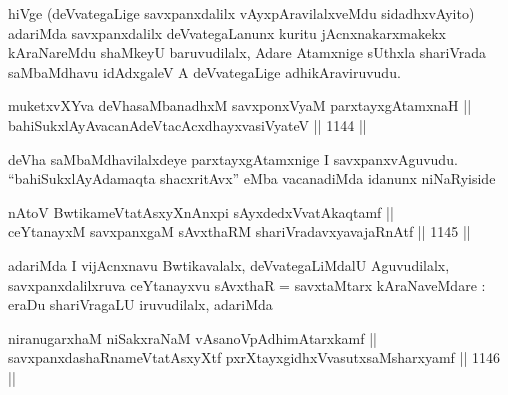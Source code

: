 \begin{artha}
hiVge (deVvategaLige savxpanxdalilx vAyxpAravilalxveMdu sidadhxvAyito) adariMda savxpanxdalilx deVvategaLanunx kuritu jAcnxnakarxmakekx kAraNareMdu shaMkeyU baruvudilalx, Adare Atamxnige sUthxla shariVrada saMbaMdhavu idAdxgaleV A deVvategaLige adhikAraviruvudu.
\end{artha}


\begin{shl}
muketxvXYva deVhasaMbanadhxM savxponxV\s yaM parxtayxgAtamxnaH || \\
bahiSukxlAyAvacanAdeVtacAcxdhayxvasiVyateV \hfill || 1144 ||
\end{shl}

\begin{artha}
deVha saMbaMdhavilalxdeye parxtayxgAtamxnige I savxpanxvAguvudu. ``bahiSukxlAyAdamaqta shacxritAvx'' eMba vacanadiMda idanunx niNaRyiside
\end{artha}


\begin{shl}
nAtoV BwtikameVtatAsxyXnAnxpi sAyxdedxVvatAkaqtamf || \\
ceYtanayxM savxpanxgaM sAvxthaRM shariVradavxyavajaRnAtf \hfill || 1145 ||  
\end{shl}

\begin{artha}
adariMda I vijAcnxnavu Bwtikavalalx, deVvategaLiMdalU Aguvudilalx, savxpanxdalilxruva ceYtanayxvu sAvxthaR = savxtaMtarx kAraNaveMdare : eraDu shariVragaLU iruvudilalx, adariMda
\end{artha}

\begin{shl}
\footnotemark[1]niranugarxhaM \footnotemark[2]niSakxraNaM \footnotemark[3]vAsanoVpAdhimAtarxkamf || \\
savxpanxdashaRnameVtatAsxyXtf \footnotemark[4]pxrXtayxgidhxVvasutxsaMsharxyamf \hfill || 1146 ||  
\end{shl}

